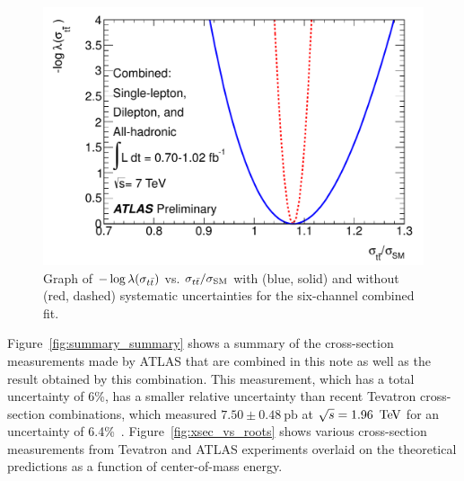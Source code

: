 



\begin{figure}[ht!]
  \begin{center}
    \includegraphics[width=.7\textwidth]{figures/comb/fullcombined_likelihood_curve}
    \caption{Graph of $-\log\lambda(\sigma_{t\bar{t}})$ vs. $\sigma_{t\bar{t}}/\sigma_{\rm SM}$ with (blue, solid) and without (red, dashed) systematic uncertainties for the six-channel combined fit.}
    \label{fig:fullcombined_likelihood_curve}
  \end{center}
\end{figure}



Figure~\ref{fig:summary_summary} shows a summary of the cross-section measurements made by ATLAS that are combined in this note as well as the result obtained by this combination.
This measurement, which has a total uncertainty of 6\%, has a smaller relative uncertainty than recent Tevatron cross-section combinations, which measured $7.50 \pm 0.48~\textrm{pb}$ at $\sqrt{s}= 1.96\, \TeV$ for an uncertainty of 6.4\%~\cite{CDFCombination}.
Figure~\ref{fig:xsec_vs_roots} shows various cross-section measurements from Tevatron and ATLAS experiments overlaid on the theoretical predictions as a function of center-of-mass energy.

